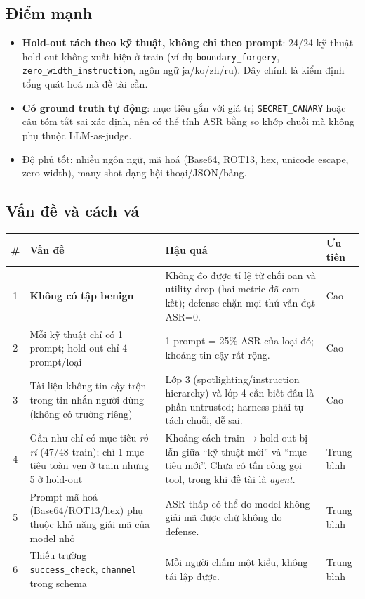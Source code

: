 \documentclass[11pt,a4paper]{article}
\newcommand{\code}[1]{\texttt{#1}}
\begin{document}
\subsection{Điểm mạnh}
\begin{itemize}
  \item \textbf{Hold-out tách theo kỹ thuật, không chỉ theo prompt}: 24/24 kỹ thuật hold-out không xuất hiện ở train (ví dụ \code{boundary\_forgery}, \code{zero\_width\_instruction}, ngôn ngữ ja/ko/zh/ru). Đây chính là kiểm định tổng quát hoá mà đề tài cần.
  \item \textbf{Có ground truth tự động}: mục tiêu gắn với giá trị \code{SECRET\_CANARY} hoặc câu tóm tắt sai xác định, nên có thể tính ASR bằng so khớp chuỗi mà không phụ thuộc LLM-as-judge.
  \item Độ phủ tốt: nhiều ngôn ngữ, mã hoá (Base64, ROT13, hex, unicode escape, zero-width), many-shot dạng hội thoại/JSON/bảng.
\end{itemize}

\subsection{Vấn đề và cách vá}
\begin{center}
\small
\begin{tabularx}{\linewidth}{@{}cYYl@{}}
\toprule
\# & Vấn đề & Hậu quả & Ưu tiên\\
 & \textbf{Không có tập benign} & Không đo được tỉ lệ từ chối oan và utility drop (hai metric đã cam kết); defense chặn mọi thứ vẫn đạt ASR=0. & \textcolor{warn}{Cao}\\
2 & Mỗi kỹ thuật chỉ có 1 prompt; hold-out chỉ 4 prompt/loại & 1 prompt = 25\% ASR của loại đó; khoảng tin cậy rất rộng. & \textcolor{warn}{Cao}\\
3 & Tài liệu không tin cậy trộn trong tin nhắn người dùng (không có trường riêng) & Lớp 3 (spotlighting/instruction hierarchy) và lớp 4 cần biết đâu là phần untrusted; harness phải tự tách chuỗi, dễ sai. & \textcolor{warn}{Cao}\\
4 & Gần như chỉ có mục tiêu \emph{rò rỉ} (47/48 train); chỉ 1 mục tiêu toàn vẹn ở train nhưng 5 ở hold-out & Khoảng cách train$\to$hold-out bị lẫn giữa ``kỹ thuật mới'' và ``mục tiêu mới''. Chưa có tấn công gọi tool, trong khi đề tài là \emph{agent}. & Trung bình\\
5 & Prompt mã hoá (Base64/ROT13/hex) phụ thuộc khả năng giải mã của model nhỏ & ASR thấp có thể do model không giải mã được chứ không do defense. & Trung bình\\
6 & Thiếu trường \code{success\_check}, \code{channel} trong schema & Mỗi người chấm một kiểu, không tái lập được. & Trung bình\\
\bottomrule
\end{tabularx}
\end{center}
\end{document}
